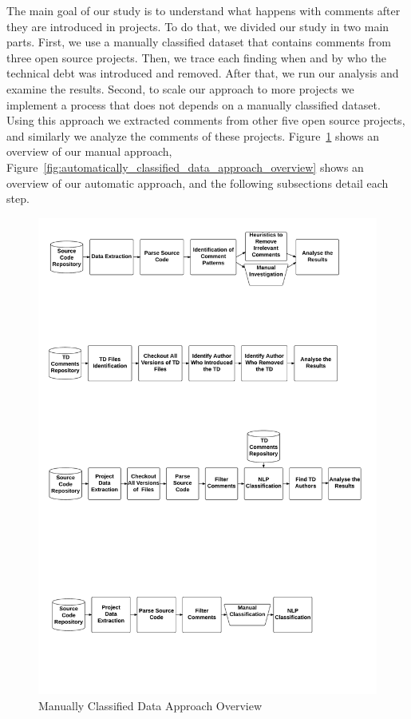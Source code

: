 
The main goal of our study is to understand what happens with \SATD comments after they are introduced in projects. To do that, we divided our study in two main parts. First, we use a manually classified dataset that contains \SATD comments from three open source projects. Then, we trace each \SATD finding when and by who the technical debt was introduced and removed. After that, we run our analysis and examine the results. Second, to scale our approach to more projects we implement a process that does not depends on a manually classified dataset. Using this approach we extracted \SATD comments from other five open source projects, and similarly we analyze the \SATD comments of these projects. Figure~\ref{fig:manually_classified_data_approach_overview} shows an overview of our manual approach, Figure~\ref{fig:automatically_classified_data_approach_overview} shows an overview of our automatic approach, and the following subsections detail each step.

\begin{figure}[thb!]
  \centering
  \includegraphics[width=1\textwidth]{figures/manually_classified_data_approach.pdf}
  \caption{Manually Classified Data Approach Overview}
  \label{fig:manually_classified_data_approach_overview}
\end{figure}

